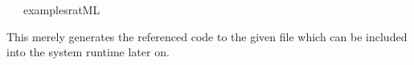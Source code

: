 \begin{isabellebody}
\ \ \ {}examples{}rat{}ML{}%
\endisatagquote
{\isafoldquote}%
%
\isadelimquote
%
\endisadelimquote
%
\begin{isamarkuptext}%
\noindent This merely generates the referenced code to the given
  file which can be included into the system runtime later on.%
\end{isamarkuptext}%
\isamarkuptrue%
%
\isadelimtheory
%
\endisadelimtheory
%
\isatagtheory
{}\isamarkupfalse%
%
\endisatagtheory
{\isafoldtheory}%
%
\isadelimtheory
%
\endisadelimtheory
\isanewline
\end{isabellebody}%
